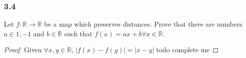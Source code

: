 \documentclass[]{report}
\begin{document}
\subsubsection{3.4}
Let $f: \mathbb{R} \rightarrow \mathbb{R}$ be a map which preserves distances. Prove that there are numbers $a \in {1, -1}$ and $b \in \mathbb{R}$ such that $f(x) = ax + b \forall x \in \mathbb{R}$.

\begin{proof}
  Given $\forall x,y \in \mathbb{R}$, $|f(x) - f(y)| = |x-y|$
  todo complete me
\end{proof}
\end{document}
